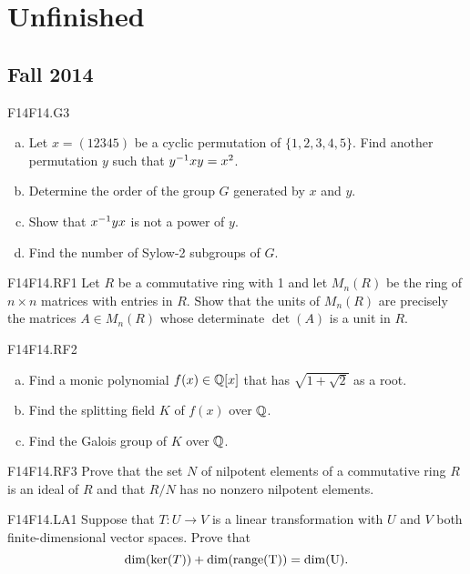 \documentclass[../AlgebraQualSolutions.tex]{subfiles}
\begin{document}
\section{Unfinished}

\subsection{Fall 2014}

\begin{prob}{F14}{F14.G3}
	\begin{enumerate}[(a)]
		\item Let $x = (12345)$ be a cyclic permutation of $\{1,2,3,4,5\}$. Find another permutation $y$ such that $y^{-1} xy = x^2$.
		\item Determine the order of the group $G$ generated by $x$ and $y$.
		\item Show that $x^{-1} y x$ is not a power of $y$.
		\item Find the number of Sylow-2 subgroups of $G$.
	\end{enumerate}
\end{prob}

\begin{prob}{F14}{F14.RF1}
	Let $R$ be a commutative ring with 1 and let $M_n(R)$ be the ring of $n \times n$ matrices with entries in $R$. Show that the units of $M_n(R)$ are precisely the matrices $A \in M_n(R)$ whose determinate $\det(A)$ is a unit in $R$.
\end{prob}

\begin{prob}{F14}{F14.RF2}
	\begin{enumerate}[(a)]
		\item Find a monic polynomial $f(x) \in \mathbb{Q}[x]$ that has $\sqrt{1 + \sqrt2}$ as a root.
		\item Find the splitting field $K$ of $f(x)$ over $\mathbb{Q}$.
		\item Find the Galois group of $K$ over $\mathbb{Q}$.
	\end{enumerate}
\end{prob}

\begin{prob}{F14}{F14.RF3}
	Prove that the set $N$ of nilpotent elements of a commutative ring $R$ is an ideal of $R$ and that $R/N$ has no nonzero nilpotent elements.
\end{prob}

\begin{prob}{F14}{F14.LA1}
	Suppose that $T: U \to V$ is a linear transformation with $U$ and $V$ both finite-dimensional vector spaces. Prove that
		\[\dim(\ker(T)) + \dim(\rm{range}(T)) = \dim(U).\]
\end{prob}
\end{document}
